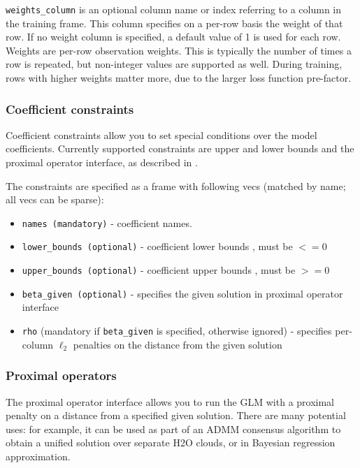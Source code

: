 \texttt{weights\_column} is an optional column name or index referring to a column in the training frame. This column specifies on a per-row basis the weight of that row.  If no weight column is specified, a default value of 1 is used for each row. Weights are per-row observation weights. This is typically the number of times a row is repeated, but non-integer values are supported as well. During training, rows with higher weights matter more, due to the larger loss function pre-factor.

\subsubsection{Coefficient constraints}

Coefficient constraints allow you to set special conditions over the model coefficients. Currently supported
constraints are upper and lower bounds and the proximal operator interface, as described in .

The constraints are specified as a frame with following vecs (matched by name; all vecs can be sparse):

\begin{itemize}
\item \texttt{names (mandatory)}  - coefficient names. 
\item \texttt{lower\_bounds (optional)} - coefficient lower bounds , must be $<= 0$
\item \texttt{upper\_bounds (optional)} - coefficient upper bounds , must be $>= 0$
\item \texttt{beta\_given (optional)} - specifies the given solution in proximal operator interface
\item \texttt{rho} (mandatory if \texttt{beta\_given} is specified, otherwise ignored) - specifies per-column  $\ell_2$ penalties on the distance from the given solution
\end{itemize}
 
\subsubsection{Proximal operators}

The proximal operator interface allows you to run the GLM with a proximal penalty on a distance from a specified
given solution. There are many potential uses: for example, it can be used as part of an ADMM consensus algorithm
to obtain a unified solution over separate H2O clouds, or in Bayesian regression approximation.


